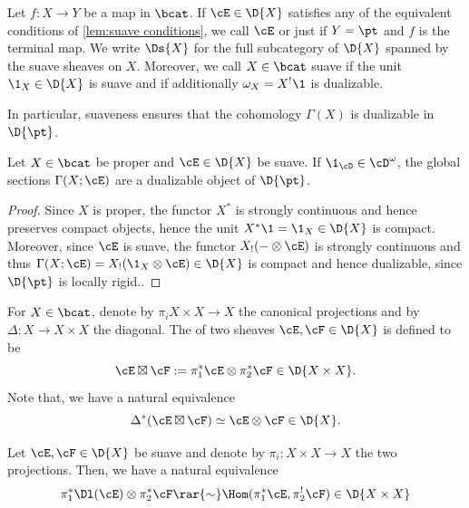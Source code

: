 \begin{defn}
  Let $f\colon X\to Y$ be a map in $\bcat$. If $\cE\in \D{X}$ satisfies any of the
  equivalent conditions of \cref{lem:suave conditions}, we call $\cE$  or just
   if $Y=\pt$ and $f$ is the terminal map. We write $\Ds{X}$ for the
  full subcategory of $\D{X}$ spanned by the suave sheaves on $X$. Moreover, we
  call $X\in \bcat$ suave if the unit $\1_{X}\in \D{X}$ is suave and 
  if additionally $\omega_{X}=X^{!}\1$ is dualizable.
\end{defn}

In particular, suaveness ensures that the cohomology $\Gamma(X)$ is dualizable in $\D{\pt}$.


\begin{prop}\label{prop: sections dualizable}
  Let $X\in \bcat$ be proper and $\cE\in \D{X}$ be suave. If $\1_{\cD}\in \cD^{\omega}$,
  the global sections $\Gamma(X;\cE)$ are a dualizable object of $\D{\pt}$.
\end{prop}
\begin{proof}
  Since $X$ is proper, the functor $X^{\ast}$ is strongly continuous and hence
  preserves compact objects, hence the unit $X^{\ast}\1=\1_{X}\in \D{X}$ is
  compact. Moreover, since $\cE$ is suave, the functor $X_{!}(-\otimes \cE)$
  is strongly continuous and thus $\Gamma(X;\cE)=X_{!}(\1_{X}\otimes \cE)\in \D{X}$
  is compact and hence dualizable, since $\D{\pt}$ is locally rigid..
\end{proof}

For $X\in \bcat$, denote by $\pi_{i}X\times X\to X$ the canonical projections and by
$\Delta\colon X \to X\times X$ the diagonal. The 
of two sheaves $\cE,\cF\in \D{X}$ is defined to be
\[ \cE\boxtimes \cF := \pi_{1}^{\ast}\cE \otimes \pi_{2}^{\ast}\cF \in \D{X\times X}.\]
Note that, we have a natural equivalence
\[ \Delta^{\ast}(\cE\boxtimes \cF)\simeq \cE\otimes \cF\in \D{X}.\]

\begin{prop}\label{prop: external hom}
Let $\cE,\cF\in \D{X}$ be suave and denote by $\pi_{i}\colon X\times X \to X$ the two projections.
Then, we have a natural equivalence
\[ \pi_{1}^{\ast}\Dl(\cE)\otimes \pi_{2}^{\ast}\cF \rar{\sim} \Hom(\pi_{1}^{\ast}\cE, \pi_{2}^{!}\cF)\in \D{X\times X}\]
\end{prop}

